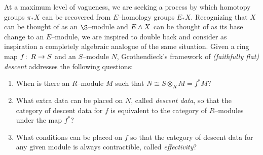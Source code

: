 At a maximum level of vagueness, we are seeking a process by which homotopy groups \(\pi_* X\) can be recovered from \(E\)--homology groups \(E_* X\).  Recognizing that \(X\) can be thought of as an \(\S\)--module and \(E \wedge X\) can be thought of as its base change to an \(E\)--module, we are inspired to double back and consider as inspiration a completely algebraic analogue of the same situation.  Given a ring map \(f\colon\thinspace R \to S\) and an \(S\)--module \(N\), Grothendieck's framework of \textit{(faithfully flat) descent} addresses the following questions:
\begin{enumerate}
\item When is there an \(R\)--module \(M\) such that \(N \cong S \otimes_R M = f^* M\)?
\item What extra data can be placed on \(N\), called \textit{descent data}, so that the category of descent data for \(f\) is equivalent to the category of \(R\)--modules under the map \(f^*\)?
\item What conditions can be placed on \(f\) so that the category of descent data for any given module is always contractible, called \textit{effectivity}?
\end{enumerate}

